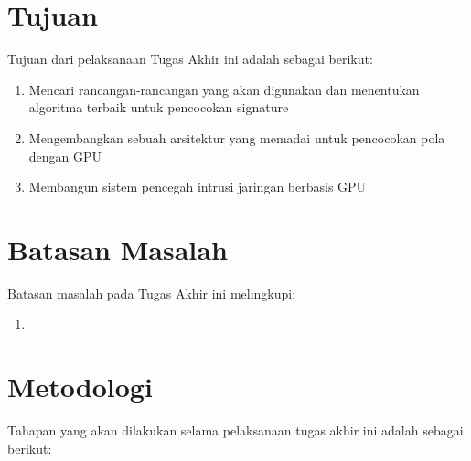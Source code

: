\section{Tujuan}

Tujuan dari pelaksanaan Tugas Akhir ini adalah sebagai berikut:

\begin{enumerate}
    \item Mencari rancangan-rancangan yang akan digunakan dan menentukan algoritma terbaik untuk pencocokan signature
    \item Mengembangkan sebuah arsitektur yang memadai untuk pencocokan pola dengan GPU
    \item Membangun sistem pencegah intrusi jaringan berbasis GPU
\end{enumerate}

\section{Batasan Masalah}

Batasan masalah pada Tugas Akhir ini melingkupi:

\begin{enumerate}
    \item \blindtext
\end{enumerate}

\section{Metodologi}

Tahapan yang akan dilakukan selama pelaksanaan tugas akhir ini adalah sebagai berikut:

